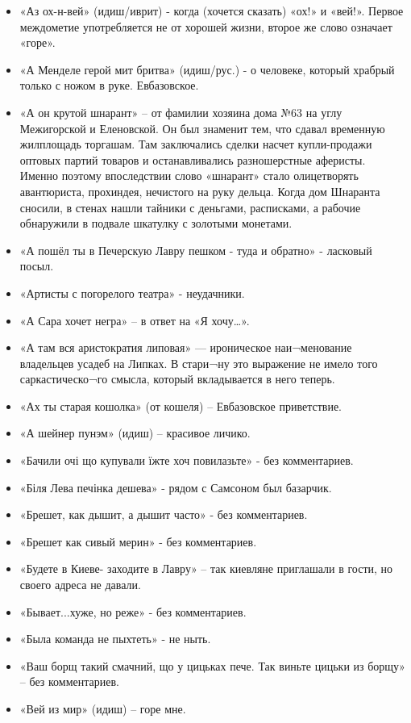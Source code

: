 \begin{itemize}
\item  «Аз ох-н-вей» (идиш/иврит) - когда (хочется сказать) «ох!» и «вей!». Первое междометие употребляется не от хорошей жизни, второе же слово означает «горе». 
\item  «А Менделе герой мит бритва» (идиш/рус.) - о человеке, который храбрый только с ножом в руке. Евбазовское.
\item  «А он крутой шнарант» – от фамилии хозяина дома №63 на углу Межигорской и Еленовской. Он был знаменит тем, что сдавал временную жилплощадь торгашам. Там заключались сделки насчет купли-продажи оптовых партий товаров и останавливались разношерстные аферисты. Именно поэтому впоследствии слово «шнарант» стало олицетворять авантюриста, прохиндея, нечистого на руку дельца. Когда дом Шнаранта сносили, в стенах нашли тайники с деньгами, расписками, а рабочие обнаружили в подвале шкатулку с золотыми монетами.
\item  «А пошёл ты в Печерскую Лавру пешком - туда и обратно» - ласковый посыл.
\item  «Артисты с погорелого театра» - неудачники.
\item  «А Сара хочет негра» – в ответ на «Я хочу…».
\item  «А там вся аристократия липовая» — ироническое наи¬менование владельцев усадеб на Липках. В стари¬ну это выражение не имело того саркастическо¬го смысла, который вкладывается в него теперь.
\item  «Ах ты старая кошолка» (от кошеля) – Евбазовское приветствие.
\item  «А шейнер пунэм» (идиш) – красивое личико.
\item  «Бачили очі що купували їжте хоч повилазьте» - без комментариев.
\item  «Біля Лева печінка дешева» - рядом с Самсоном был базарчик.
\item  «Брешет, как дышит, а дышит часто» - без комментариев.
\item  «Брешет как сивый мерин» - без комментариев.
\item  «Будете в Киеве- заходите в Лавру» – так киевляне приглашали в гости, но своего адреса не давали.
\item  «Бывает...хуже, но реже» - без комментариев.
\item  «Была команда не пыхтеть» - не ныть.
\item  «Ваш борщ такий смачний, що у цицьках пече. Так виньте цицьки из борщу» – без комментариев.
\item  «Вей из мир» (идиш) – горе мне.

\end{itemize}
